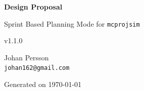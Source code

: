 \documentclass[10pt,a4paper,twoside,openright]{report}
\makeatletter
\newcommand{\reportauthor}{Johan Persson \\ \texttt{johan162@gmail.com}}
\makeatother
\begin{document}
\begin{titlepage}
  \centering
  \vspace*{2.0cm}
  {\Huge\bfseries\color{brandblue}Design Proposal\par}
  \vspace{1.2cm}
  {\Large Sprint Based Planning Mode for \texttt{mcprojsim}\par}
  \vspace{0.1cm}
  {\Large v1.1.0\par}
  \vspace{0.8cm}
  {\large \reportauthor\par}
  
  \vfill
  {\large Generated on \today\par}
\end{titlepage}

\tableofcontents
\clearpage

\end{document}
